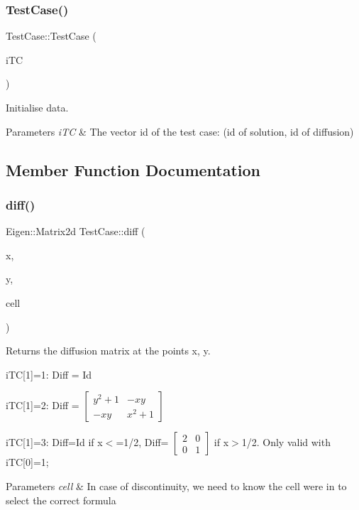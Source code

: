 \subsubsection{\texorpdfstring{Test\+Case()}{TestCase()}}
{\footnotesize\ttfamily Test\+Case\+::\+Test\+Case (\begin{DoxyParamCaption}\item[{const std\+::vector$<$ int $>$}]{i\+TC }\end{DoxyParamCaption})}



Initialise data. 


\begin{DoxyParams}{Parameters}
{\em i\+TC} & The vector id of the test case\+: (id of solution, id of diffusion) \\
\hline
\end{DoxyParams}


\subsection{Member Function Documentation}
\mbox{\label{classTestCase_aaf745f4815ce0e9c16d8bded9f9b3596}} 
\subsubsection{\texorpdfstring{diff()}{diff()}}
{\footnotesize\ttfamily Eigen\+::\+Matrix2d Test\+Case\+::diff (\begin{DoxyParamCaption}\item[{const double}]{x,  }\item[{const double}]{y,  }\item[{const \hyperlink{classHArDCore2D_1_1Cell}{Cell} $\ast$}]{cell }\end{DoxyParamCaption})}



Returns the diffusion matrix at the points x, y. 

i\+TC\mbox{[}1\mbox{]}=1\+: Diff = Id

i\+TC\mbox{[}1\mbox{]}=2\+: Diff = $\left[\begin{array}{cc}y^2+1 & -xy\\ -xy & x^2+1\end{array}\right]$

i\+TC\mbox{[}1\mbox{]}=3\+: Diff=Id if x$<$=1/2, Diff= $\left[\begin{array}{cc}2 & 0\\ 0 & 1\end{array}\right]$ if x$>$1/2. Only valid with i\+TC\mbox{[}0\mbox{]}=1; 
\begin{DoxyParams}{Parameters}
{\em cell} & In case of discontinuity, we need to know the cell we\textquotesingle{}re in to select the correct formula \\
\hline
\end{DoxyParams}
\mbox{\label{classTestCase_aa32221ff5dd860c050a28661406a87dc}} 
